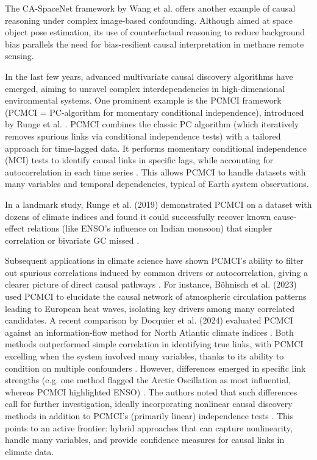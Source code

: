The CA-SpaceNet framework by Wang et al. \cite{wang_ca-spacenet_2022} offers another example of causal reasoning under complex image-based confounding. Although aimed at space object pose estimation, its use of counterfactual reasoning to reduce background bias parallels the need for bias-resilient causal interpretation in methane remote sensing.

In the last few years, advanced multivariate causal discovery algorithms have emerged, aiming to unravel complex interdependencies in high-dimensional environmental systems. One prominent example is the PCMCI framework (PCMCI = PC-algorithm for momentary conditional independence), introduced by Runge et al. \cite{Runge2020EGU}. PCMCI combines the classic PC algorithm (which iteratively removes spurious links via conditional independence tests) with a tailored approach for time-lagged data. It performs momentary conditional independence (MCI) tests to identify causal links in specific lags, while accounting for autocorrelation in each time series \cite{Runge2019_2}. This allows PCMCI to handle datasets with many variables and temporal dependencies, typical of Earth system observations.

In a landmark study, Runge et al. (2019) \cite{Runge2019} demonstrated PCMCI on a dataset with dozens of climate indices and found it could successfully recover known cause-effect relations (like ENSO's influence on Indian monsoon) that simpler correlation or bivariate GC missed \cite{Runge2019, Docquier2024}.

Subsequent applications in climate science have shown PCMCI's ability to filter out spurious correlations induced by common drivers or autocorrelation, giving a clearer picture of direct causal pathways \cite{Docquier2024}. For instance, Böhnisch et al. (2023) \cite{bohnisch_european_2023} used PCMCI to elucidate the causal network of atmospheric circulation patterns leading to European heat waves, isolating key drivers among many correlated candidates. A recent comparison by Docquier et al. (2024) \cite{Docquier2024} evaluated PCMCI against an information-flow method for North Atlantic climate indices \cite{Docquier2024}. Both methods outperformed simple correlation in identifying true links, with PCMCI excelling when the system involved many variables, thanks to its ability to condition on multiple confounders \cite{Docquier2024}. However, differences emerged in specific link strengths (e.g. one method flagged the Arctic Oscillation as most influential, whereas PCMCI highlighted ENSO) \cite{Docquier2024}. The authors noted that such differences call for further investigation, ideally incorporating nonlinear causal discovery methods in addition to PCMCI's (primarily linear) independence tests \cite{Docquier2024}. This points to an active frontier: hybrid approaches that can capture nonlinearity, handle many variables, and provide confidence measures for causal links in climate data.

